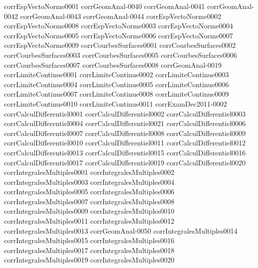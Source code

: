 {corrEspVectoNorme0001}
{corrGeomAnal-0040}
{corrGeomAnal-0041}
{corrGeomAnal-0042}
{corrGeomAnal-0043}
{corrGeomAnal-0044}
{corrEspVectoNorme0002}
{corrEspVectoNorme0008}
{corrEspVectoNorme0003}
{corrEspVectoNorme0004}
{corrEspVectoNorme0005}
{corrEspVectoNorme0006}
{corrEspVectoNorme0007}
{corrEspVectoNorme0009}
{corrCourbesSurfaces0001}
{corrCourbesSurfaces0002}
{corrCourbesSurfaces0003}
{corrCourbesSurfaces0005}
{corrCourbesSurfaces0006}
{corrCourbesSurfaces0007}
{corrCourbesSurfaces0008}
{corrGeomAnal-0019}
{corrLimiteContinue0001}
{corrLimiteContinue0002}
{corrLimiteContinue0003}
{corrLimiteContinue0004}
{corrLimiteContinue0005}
{corrLimiteContinue0006}
{corrLimiteContinue0007}
{corrLimiteContinue0008}
{corrLimiteContinue0009}
{corrLimiteContinue0010}
{corrLimiteContinue0011}
{corrExamDec2011-0002}
{corrCalculDifferentiel0001}
{corrCalculDifferentiel0002}
{corrCalculDifferentiel0003}
{corrCalculDifferentiel0004}
{corrCalculDifferentiel0021}
{corrCalculDifferentiel0006}
{corrCalculDifferentiel0007}
{corrCalculDifferentiel0008}
{corrCalculDifferentiel0009}
{corrCalculDifferentiel0010}
{corrCalculDifferentiel0011}
{corrCalculDifferentiel0012}
{corrCalculDifferentiel0013}
{corrCalculDifferentiel0015}
{corrCalculDifferentiel0016}
{corrCalculDifferentiel0017}
{corrCalculDifferentiel0019}
{corrCalculDifferentiel0020}
{corrIntegralesMultiples0001}
{corrIntegralesMultiples0002}
{corrIntegralesMultiples0003}
{corrIntegralesMultiples0004}
{corrIntegralesMultiples0005}
{corrIntegralesMultiples0006}
{corrIntegralesMultiples0007}
{corrIntegralesMultiples0008}
{corrIntegralesMultiples0009}
{corrIntegralesMultiples0010}
{corrIntegralesMultiples0011}
{corrIntegralesMultiples0012}
{corrIntegralesMultiples0013}
{corrGeomAnal-0050}
{corrIntegralesMultiples0014}
{corrIntegralesMultiples0015}
{corrIntegralesMultiples0016}
{corrIntegralesMultiples0017}
{corrIntegralesMultiples0018}
{corrIntegralesMultiples0019}
{corrIntegralesMultiples0020}
